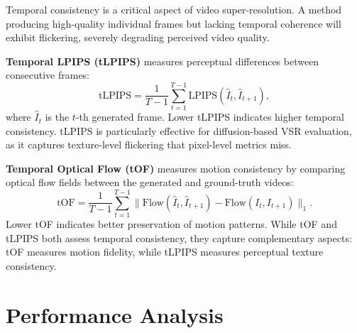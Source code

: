 Temporal consistency is a critical aspect of video 
super-resolution. A method producing high-quality individual 
frames but lacking temporal coherence will exhibit flickering, 
severely degrading perceived video quality.

\textbf{Temporal LPIPS (tLPIPS)} \cite{chu2020temporal} 
measures perceptual differences between consecutive frames:
\begin{equation}
    \mathrm{tLPIPS} = \frac{1}{T-1} \sum_{t=1}^{T-1} 
    \mathrm{LPIPS}(\hat{I}_t, \hat{I}_{t+1}),
    \label{eq:tlpips}
\end{equation}
where $\hat{I}_t$ is the $t$-th generated frame. Lower tLPIPS 
indicates higher temporal consistency. tLPIPS is particularly 
effective for diffusion-based VSR evaluation, as it captures 
texture-level flickering that pixel-level metrics miss.

\textbf{Temporal Optical Flow (tOF)} \cite{chu2020temporal} 
measures motion consistency by comparing optical flow fields 
between the generated and ground-truth videos:
\begin{equation}
    \mathrm{tOF} = \frac{1}{T-1} \sum_{t=1}^{T-1} 
    \big\| \mathrm{Flow}(\hat{I}_t, \hat{I}_{t+1}) 
    - \mathrm{Flow}(I_t, I_{t+1}) \big\|_1.
    \label{eq:tof}
\end{equation}
Lower tOF indicates better preservation of motion patterns. 
While tOF and tLPIPS both assess temporal consistency, they 
capture complementary aspects: tOF measures motion fidelity, 
while tLPIPS measures perceptual texture consistency.


\section{Performance Analysis}
\label{sec:performance_analysis}

